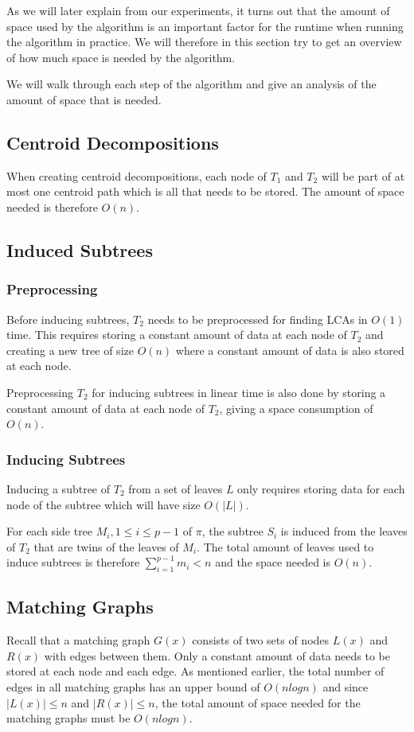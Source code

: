 As we will later explain from our experiments, it turns out that the amount of space used by the algorithm is an important factor for the runtime when running the algorithm in practice. We will therefore in this section try to get an overview of how much space is needed by the algorithm.

We will walk through each step of the algorithm and give an analysis of the amount of space that is needed.

\subsection{Centroid Decompositions}
When creating centroid decompositions, each node of $T_1$ and $T_2$ will be part of at most one centroid path which is all that needs to be stored. The amount of space needed is therefore $O(n)$.

\subsection{Induced Subtrees}
\subsubsection{Preprocessing}
Before inducing subtrees, $T_2$ needs to be preprocessed for finding LCAs in $O(1)$ time. This requires storing a constant amount of data at each node of $T_2$ and creating a new tree of size $O(n)$ where a constant amount of data is also stored at each node.

Preprocessing $T_2$ for inducing subtrees in linear time is also done by storing a constant amount of data at each node of $T_2$, giving a space consumption of $O(n)$.

\subsubsection{Inducing Subtrees}
Inducing a subtree of $T_2$ from a set of leaves $L$ only requires storing data for each node of the subtree which will have size $O(|L|)$.

For each side tree $M_i, 1 \le i \le p-1$ of $\pi$, the subtree $S_i$ is induced from the leaves of $T_2$ that are twins of the leaves of $M_i$. The total amount of leaves used to induce subtrees is therefore $\sum_{i=1}^{p-1} m_i < n$ and the space needed is $O(n)$.

\subsection{Matching Graphs}
Recall that a matching graph $G(x)$ consists of two sets of nodes $L(x)$ and $R(x)$ with edges between them. Only a constant amount of data needs to be stored at each node and each edge. As mentioned earlier, the total number of edges in all matching graphs has an upper bound of $O(nlogn)$ and since $|L(x)| \le n$ and $|R(x)| \le n$, the total amount of space needed for the matching graphs must be $O(nlogn)$.

